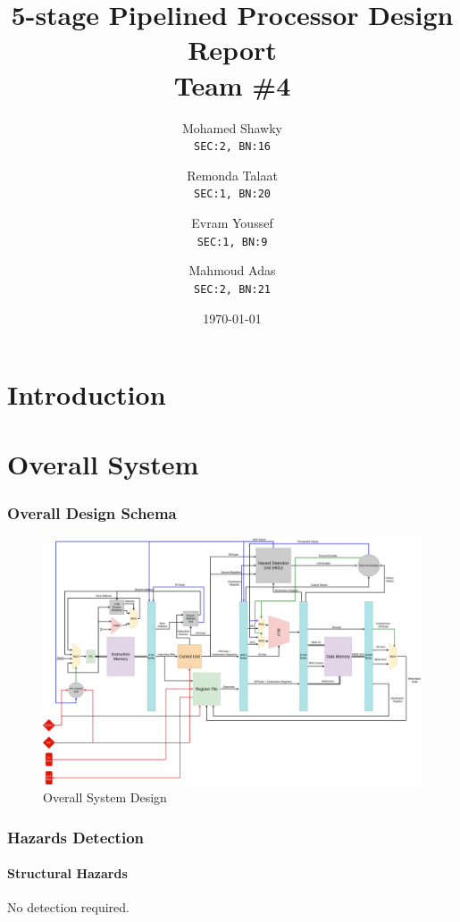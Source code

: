 \documentclass[12pt]{report}
\title{\textbf{5-stage Pipelined Processor Design Report}\\Team \#4}
\author{
  Mohamed Shawky\\
  \small\texttt{SEC:2, BN:16}
  \and
  Remonda Talaat\\
  \small\texttt{SEC:1, BN:20}
  \and
  Evram Youssef\\
  \small\texttt{SEC:1, BN:9}
  \and
  Mahmoud Adas\\
  \small\texttt{SEC:2, BN:21}
}
\date{\today}
\begin{document}
\thispagestyle{empty}

\maketitle
\tableofcontents
\listoffigures
\listoftables
\clearpage


\part{Introduction}

\part{Overall System}

\section{Overall Design Schema}
\begin{center}
    \begin{figure}[hp]
        \centering
        \includegraphics[width=\textwidth]{overall_system}
        \caption{Overall System Design}
        \label{fig:overall}
    \end{figure}
\end{center}

\section{Hazards Detection}

\subsection{Structural Hazards}
No detection required.
\end{document}
